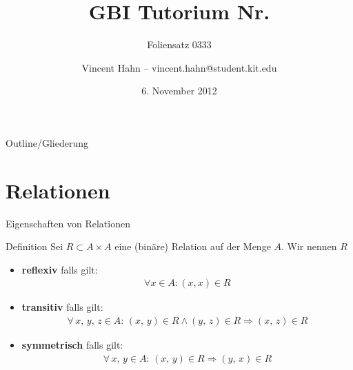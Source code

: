 \documentclass[18pt]{beamer}
\title[GBI Tutorium]{GBI Tutorium Nr. }
\subtitle{Foliensatz 0333}
\date{6. November 2012}
\author{Vincent Hahn -- vincent.hahn@student.kit.edu}
\institute{}
\begin{document}

\begin{frame}
    \titlepage
\end{frame}

\begin{frame}{Outline/Gliederung}
    \tableofcontents
\end{frame}

\section{Relationen}
\begin{frame}{Eigenschaften von Relationen}
    \begin{block}{Definition}
        Sei $R \subset A \times A$ eine (binäre) Relation auf der Menge $A$. Wir nennen $R$
        \begin{itemize}
            \item \textbf{reflexiv} falls gilt:
                \begin{align*}
                    \forall x \in A: \left( x,x\right) \in R
                \end{align*}
            \item\textbf{transitiv} falls gilt:
                \begin{align*}
                    \forall\, x,\, y,\, z \in A:\,\left( x,\, y\right) \in R \wedge \left(y,\, z\right) \in R \Rightarrow \left( x,\, z\right) \in R
                \end{align*}
            \item \textbf{symmetrisch} falls gilt:
                \begin{align*}
                    \forall\, x,\, y \in A:\,\left( x,\, y\right) \in R \Rightarrow \left( y,\, x\right) \in R
                \end{align*}
        \end{itemize}
    \end{block}
\end{frame}
\end{document}
